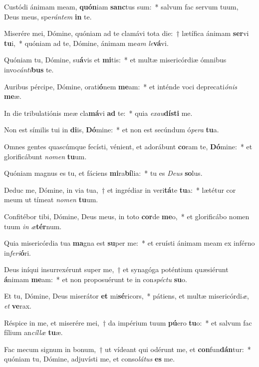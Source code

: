 \item Custódi ánimam meam, \textbf{quón}iam \textbf{sanc}tus sum:~* salvum fac servum tuum, Deus meus, spe\textit{rán}\textit{tem} \textbf{in} te.
\item Miserére mei, Dómine, quóniam ad te clamávi tota die:~† lætífica ánimam \textbf{ser}vi \textbf{tu}i,~* quóniam ad te, Dómine, ánimam me\textit{am} \textit{le}\textbf{vá}vi.
\item Quóniam tu, Dómine, su\textbf{á}vis et \textbf{mi}tis:~* et multæ misericórdiæ ómnibus invo\textit{cán}\textit{ti}\textbf{bus} te.
\item Auribus pércipe, Dómine, orati\textbf{ó}nem \textbf{me}am:~* et inténde voci deprecati\textit{ó}\textit{nis} \textbf{me}æ.
\item In die tribulatiónis meæ cla\textbf{má}vi \textbf{ad} te:~* quia \textit{ex}\textit{au}\textbf{dís}\textbf{ti} me.
\item Non est símilis tui in \textbf{di}is, \textbf{Dó}mine:~* et non est secúndum ó\textit{pe}\textit{ra} \textbf{tu}a.
\item Omnes gentes quascúmque fecísti, vénient, et adorábunt \textbf{co}ram te, \textbf{Dó}mine:~* et glorificábunt \textit{no}\textit{men} \textbf{tu}um.
\item Quóniam magnus es tu, et fáciens \textbf{mi}ra\textbf{bí}lia:~* tu es \textit{De}\textit{us} \textbf{so}lus.
\item Deduc me, Dómine, in via tua,~† et ingrédiar in veri\textbf{tá}te \textbf{tu}a:~* lætétur cor meum ut tímeat \textit{no}\textit{men} \textbf{tu}um.
\item Confitébor tibi, Dómine, Deus meus, in toto \textbf{cor}de \textbf{me}o,~* et glorificábo nomen tuum \textit{in} \textit{æ}\textbf{tér}num.
\item Quia misericórdia tua \textbf{ma}gna est \textbf{su}per me:~* et eruísti ánimam meam ex inférno in\textit{fe}\textit{ri}\textbf{ó}ri.
\item Deus iníqui insurrexérunt super me,~† et synagóga poténtium quæsiérunt \textbf{á}nimam \textbf{me}am:~* et non proposuérunt te in con\textit{spéc}\textit{tu} \textbf{su}o.
\item Et tu, Dómine, Deus miserátor \textbf{et} mi\textbf{sé}ricors,~* pátiens, et multæ misericórdi\textit{æ}, \textit{et} \textbf{ve}rax.
\item Réspice in me, et miserére mei,~† da impérium tuum \textbf{pú}ero \textbf{tu}o:~* et salvum fac fílium an\textit{cíl}\textit{læ} \textbf{tu}æ.
\item Fac mecum signum in bonum,~† ut vídeant qui odérunt me, et \textbf{con}fun\textbf{dán}tur:~* quóniam tu, Dómine, adjuvísti me, et conso\textit{lá}\textit{tus} \textbf{es} me.
